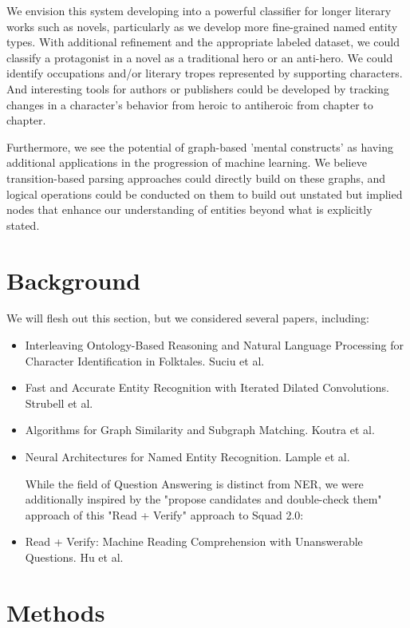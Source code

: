 \documentclass[11pt,a4paper]{article}
\begin{document}
We envision this system developing into a powerful classifier for longer literary works such as novels, particularly as we develop more fine-grained named entity types. With additional refinement and the appropriate labeled dataset, we could classify a protagonist in a novel as a traditional hero or an anti-hero. We could identify occupations and/or literary tropes represented by supporting characters. And interesting tools for authors or publishers could be developed by tracking changes in a character's behavior from heroic to antiheroic from chapter to chapter.

Furthermore, we see the potential of graph-based 'mental constructs' as having additional applications in the progression of machine learning. We believe transition-based parsing approaches could directly build on these graphs, and logical operations could be conducted on them to build out unstated but implied nodes that enhance our understanding of entities beyond what is explicitly stated.

\section{Background}

We will flesh out this section, but we considered several papers, including:
\begin{itemize}
\item Interleaving Ontology-Based Reasoning and Natural Language Processing for Character Identification in Folktales. Suciu et al.

\item Fast and Accurate Entity Recognition with Iterated Dilated Convolutions. Strubell et al.

\item Algorithms for Graph Similarity and Subgraph Matching. Koutra et al.

\item Neural Architectures for Named Entity Recognition. Lample et al.

While the field of Question Answering is distinct from NER, we were additionally inspired by the "propose candidates and double-check them" approach of this "Read + Verify" approach to Squad 2.0:

\item Read + Verify: Machine Reading Comprehension with Unanswerable Questions. Hu et al.
\end{itemize}

\section{Methods}
\end{document}
